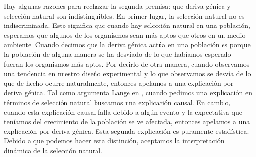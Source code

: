 Hay algunas razones para rechazar la segunda premisa: que deriva génica y selección natural son indistinguibles. En primer lugar, la selección natural no es indiscriminada. Esto significa que cuando hay selección natural en una población, esperamos que algunos de los organismos sean más aptos que otros en un medio ambiente.
Cuando decimos que la deriva génica actúa en una población es porque la población de alguna manera se ha desviado de lo que habíamos esperado fueran los organismos más aptos.
Por decirlo de otra manera, cuando observamos una tendencia en nuestro diseño experimental y lo que observamos se desvía de lo que de hecho ocurre naturalmente, entonces apelamos a una explicación por deriva génica. Tal como argumenta Lange en \citeyear{Lange2013}, cuando pedimos una explicación en términos de selección natural buscamos una explicación causal. En cambio, cuando esta explicación causal falla debido a algún evento y la expectativa que teníamos del crecimiento de la población se ve afectada, entonces apelamos a una explicación por deriva génica. Esta segunda explicación es puramente estadística. Debido a que podemos hacer esta distinción, aceptamos la interpretación dinámica de la selección natural.

